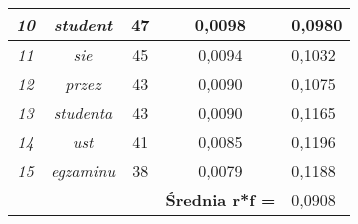 \documentclass[a4paper]{article}
\begin{document}
\begin{table}
\begin{tabular}{ccc|c|l|}
\multicolumn{1}{|c|}{\textit{10}}                & \multicolumn{1}{c|}{\textit{student}}  & 47                                & 0,0098                                     & 0,0980 \\ \hline
\multicolumn{1}{|c|}{\textit{11}}                & \multicolumn{1}{c|}{\textit{sie}}      & 45                                & 0,0094                                     & 0,1032 \\ \hline
\multicolumn{1}{|c|}{\textit{12}}                & \multicolumn{1}{c|}{\textit{przez}}    & 43                                & 0,0090                                     & 0,1075 \\ \hline
\multicolumn{1}{|c|}{\textit{13}}                & \multicolumn{1}{c|}{\textit{studenta}} & 43                                & 0,0090                                     & 0,1165 \\ \hline
\multicolumn{1}{|c|}{\textit{14}}                & \multicolumn{1}{c|}{\textit{ust}}      & 41                                & 0,0085                                     & 0,1196 \\ \hline
\multicolumn{1}{|c|}{\textit{15}}                & \multicolumn{1}{c|}{\textit{egzaminu}} & 38                                & 0,0079                                     & 0,1188 \\ \hline
\multicolumn{1}{l}{}                             &                                        &                                   & \textbf{Średnia r*f =}                     & 0,0908 \\ \cline{4-5} 
\end{tabular}
\end{table}
\end{document}
